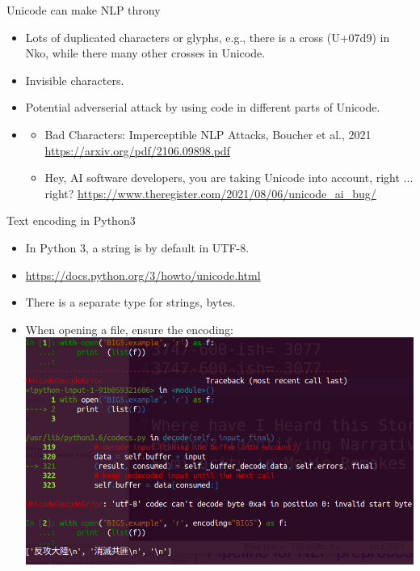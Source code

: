 \documentclass[11pt, handout]{beamer}
\begin{document}
\begin{frame}{Unicode can make NLP throny}
  \begin{itemize}[<+->]
    \item Lots of duplicated characters or glyphs, e.g., there is a cross (U+07d9) in Nko, while there many other crosses in Unicode. 
    \item Invisible characters. 
    \item Potential adverserial attack by using code in different parts of Unicode.   
    \item   
    \begin{itemize}
      \item Bad‌‌‌‌‌‌‌‌‌‌‌‌‌‌‌‌‌‌‌‌‌‌‌‌‌‌‌‌‌‌‌‌‌‌‌‌‌‌‌‌‌‌‌‌‌‌‌‌‌‌‌‌‌‌‌‌‌‌‌‌‌‌‌‌‌‌‌‌‌‌‌‌‌‌‌‌‌‌‌‌‌‌‌‌‌‌‌‌‌‌‌‌‌‌‌ Characters: Imperceptible NLP Attacks, Boucher et al., 2021 \url{https://arxiv.org/pdf/2106.09898.pdf}
      \item Hey, AI software developers, you are taking Unicode into account, right ... right? \url{https://www.theregister.com/2021/08/06/unicode_ai_bug/}
    \end{itemize} 
  \end{itemize}
\end{frame}

\begin{frame}{Text encoding in Python3}
 \begin{itemize}[<+->]
  \item In Python 3, a string is by default in UTF-8. 
  \item \url{https://docs.python.org/3/howto/unicode.html}
  \item There is a separate type for strings, bytes.
  \item When opening a file, ensure the encoding:
  \includegraphics[width=\textwidth]{BIG5_encoding.png}
 \end{itemize}
\end{frame}
\end{document}
